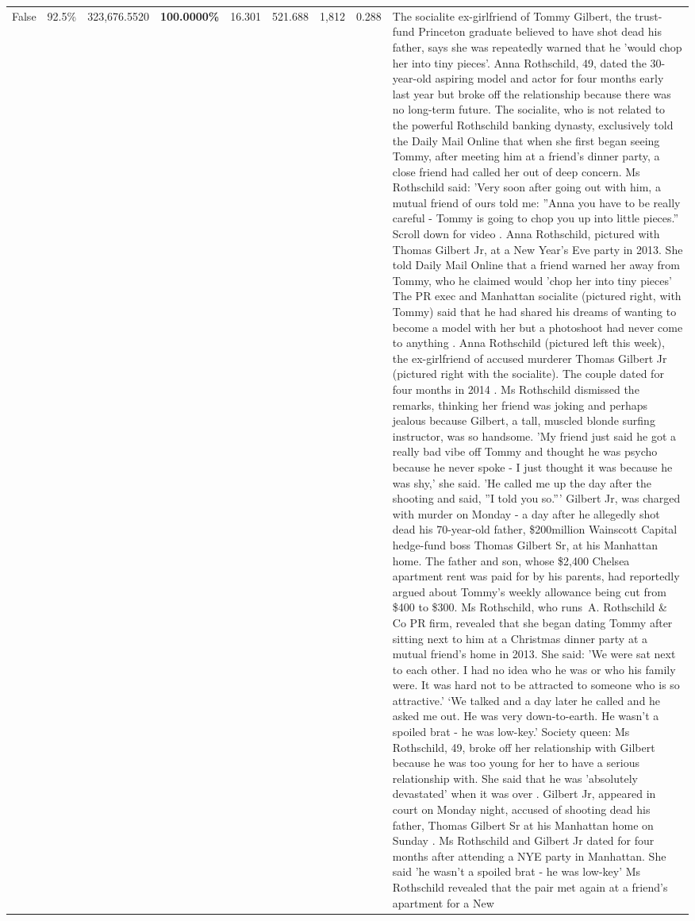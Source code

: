 \begin{table}[H]
\begin{tabular}{lllrlllll}
False & 92.5\% & 323,676.5520 & \bfseries \color{red} 100.0000\% & 16.301 & 521.688 & 1,812 & 0.288 & The socialite ex-girlfriend of Tommy Gilbert, the trust-fund Princeton graduate believed to have shot dead his father, says she was repeatedly warned that he 'would chop her into tiny pieces'. Anna Rothschild, 49, dated the 30-year-old aspiring model and actor for four months early last year but broke off the relationship because there was no long-term future. The socialite, who is not related to the powerful Rothschild banking dynasty, exclusively told the Daily Mail Online that when she first began seeing Tommy, after meeting him at a friend's dinner party, a close friend had called her out of deep concern. Ms Rothschild said: 'Very soon after going out with him, a mutual friend of ours told me: ''Anna you have to be really careful - Tommy is going to chop you up into little pieces.'' Scroll down for video . Anna Rothschild, pictured with Thomas Gilbert Jr, at a New Year's Eve party in 2013. She told Daily Mail Online that a friend warned her away from Tommy, who he claimed would 'chop her into tiny pieces' The PR exec and Manhattan socialite (pictured right, with Tommy) said that he had shared his dreams of wanting to become a model with her but a photoshoot had never come to anything . Anna Rothschild (pictured left this week), the ex-girlfriend of accused murderer Thomas Gilbert Jr (pictured right with the socialite). The couple dated for four months in 2014 . Ms Rothschild dismissed the remarks, thinking her friend was joking and perhaps jealous because Gilbert, a tall, muscled blonde surfing instructor, was so handsome. 'My friend just said he got a really bad vibe off Tommy and thought he was psycho because he never spoke - I just thought it was because he was shy,' she said. 'He called me up the day after the shooting and said, ''I told you so.''' Gilbert Jr, was charged with murder on Monday - a day after he allegedly shot dead his 70-year-old father, \$200million Wainscott Capital hedge-fund boss Thomas Gilbert Sr, at his Manhattan home. The father and son, whose \$2,400 Chelsea apartment rent was paid for by his parents, had reportedly argued about Tommy's weekly allowance being cut from \$400 to \$300. Ms Rothschild, who runs A. Rothschild \& Co PR firm, revealed that she began dating Tommy after sitting next to him at a Christmas dinner party at a mutual friend's home in 2013. She said: 'We were sat next to each other. I had no idea who he was or who his family were. It was hard not to be attracted to someone who is so attractive.' ‘We talked and a day later he called and he asked me out. He was very down-to-earth. He wasn’t a spoiled brat - he was low-key.’ Society queen: Ms Rothschild, 49, broke off her relationship with Gilbert because he was too young for her to have a serious relationship with. She said that he was 'absolutely devastated' when it was over . Gilbert Jr, appeared in court on Monday night, accused of shooting dead his father, Thomas Gilbert Sr at his Manhattan home on Sunday . Ms Rothschild and Gilbert Jr dated for four months after attending a NYE party in Manhattan. She said 'he wasn't a spoiled brat - he was low-key' Ms Rothschild revealed that the pair met again at a friend’s apartment for a New 
\end{tabular}
\end{table}
